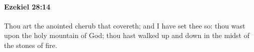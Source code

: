 
		\paragraph{Ezekiel 28:14} %
			\label{EZEKIEL-28-14}

			Thou art the anointed cherub that covereth; and I have set thee so: thou wast upon the holy mountain of God; thou hast walked up and down in the midst of the stones of fire.


